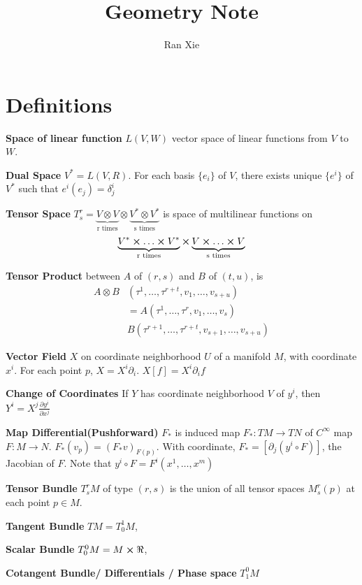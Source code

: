 \documentclass[12pt]{article}
\title{Geometry Note}
\author{Ran Xie}
\begin{document}
\twocolumn
\maketitle
\section{Definitions}

\textbf{Space of linear function} $L(V, W)$ vector space of linear functions from $V$ to $W$.

\textbf{Dual Space} $V^* = L(V, R)$. For each basis $\{e_i\}$ of $V$, there exists unique $\{e^i\}$ of $V^*$ such that $e^i (e_j) = \delta^i_j$

\textbf{Tensor Space} $T^r_s = \underbrace{V \otimes V}_\text{r times} \otimes \underbrace{V^* \otimes V^*}_\text{s times}  $  is space of multilinear functions on $$\underbrace{V^* \cross \ldots \cross V^*}_\text{r times} \cross \underbrace{V \cross \ldots \cross V}_\text{s times}$$

\textbf{Tensor Product} between $A$ of $(r,s)$ and $B$ of $(t, u)$,  is $$\begin{aligned}  A \otimes B &(\tau^1,\ldots, \tau^{r+t}, v_1,\ldots, v_{s+u}) \\ & = A(\tau^1, \ldots, \tau^r, v_1, \ldots, v_s) \\ &B(\tau^{r+1}, \ldots , \tau^{r+t}, v_{s+1}, \ldots, v_{s+u})\end{aligned}$$

\textbf{Vector Field} $X$ on coordinate neighborhood $U$ of a manifold $M$,  with coordinate $x^i$. For each point $p$, $X = X^i \partial_i$.  $X[f] = X^i \partial_i f$

\textbf{Change of Coordinates} If $Y$ has coordinate neighborhood $V$ of $y^i$, then $Y^i = X^j \frac{\partial y^i }{\partial x^j}$

\textbf{Map Differential(Pushforward)} $F_*$ is induced map $F_*: TM \rightarrow TN$ of $C^\infty$ map $F: M\rightarrow N$. $F_* (v_p) = (F_*v)_{F(p)}$. With coordinate, $F_* = [ \partial_j ( y^i \circ F ) ]$, the Jacobian of $F$. Note that $y^i \circ F = F^i(x^1, \ldots, x^m)$

\textbf{Tensor Bundle} $T^r_s M$  of type $(r,s)$ is the union of all tensor spaces $M^r_s(p)$ at each point $p \in M$.  

\textbf{Tangent Bundle} $TM=T^1_0M$, 

\textbf{Scalar Bundle} $T^0_0M = M \cross \real$, 

\textbf{Cotangent Bundle/ Differentials / Phase space} $T^0_1M$
\end{document}
